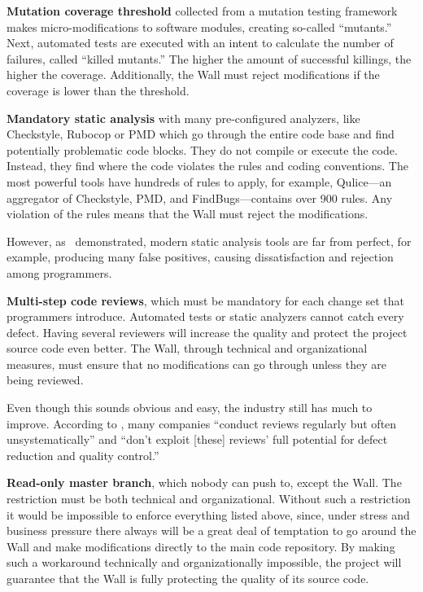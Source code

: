 \documentclass{main}
\begin{document}
\textbf{Mutation coverage threshold} collected from a mutation testing
framework makes micro-modifications to software modules, creating
so-called ``mutants.'' Next, automated tests are executed with an intent
to calculate the number of failures, called ``killed mutants.'' The higher
the amount of successful killings, the higher the coverage.
Additionally, the Wall must reject modifications if the coverage
is lower than the threshold.

\textbf{Mandatory static analysis} with many pre-configured analyzers, like
Checkstyle, Rubocop or PMD which go through the entire code base and
find potentially problematic code blocks. They do not compile or execute the
code. Instead, they find where the code violates the rules and coding
conventions. The most powerful tools have hundreds of rules to apply,
for example, Qulice---an aggregator of Checkstyle, PMD, and
FindBugs---contains over 900 rules. Any violation of the rules means that the Wall must reject the modifications.

However, as~\textcite{johnson2013} demonstrated, modern static analysis tools are
far from perfect, for example, producing many false positives, causing
dissatisfaction and rejection among programmers.

\textbf{Multi-step code reviews}, which must be mandatory for each
change set that programmers introduce. Automated tests or static analyzers cannot catch every defect. Having several reviewers will increase the
quality and protect the project source code even better. The Wall, through
technical and organizational measures, must ensure that no modifications
can go through unless they are being reviewed.

Even though this sounds obvious and easy, the industry still has much to improve. According to \textcite{ciolkowski2003}, many companies
``conduct reviews regularly but often unsystematically'' and
``don't exploit [these] reviews' full potential for defect reduction and quality control.''

\textbf{Read-only master branch}, which nobody can push to, except the Wall.
The restriction must be both technical and organizational. Without such
a restriction it would be impossible to enforce everything listed above, since,
under stress and business pressure there always will be a great deal of temptation
to go around the Wall and make modifications directly to the main code repository.
By making such a workaround technically and organizationally impossible, the
project will guarantee that the Wall is fully protecting the quality
of its source code.
\end{document}
